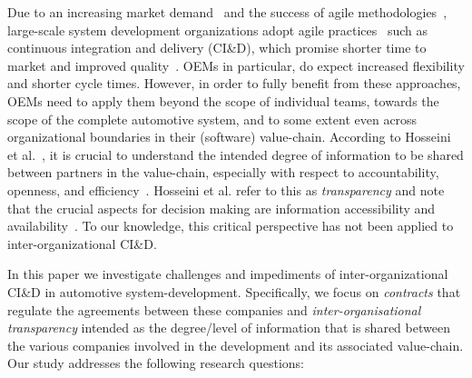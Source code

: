 Due to an increasing market demand~\cite{olsson2012climbing} and the success of agile methodologies~\cite{laanti2011agile}, large-scale system development organizations adopt agile practices~\cite{jalali2010agile} such as continuous integration and delivery (CI\&D), which promise shorter time to market and improved quality~\cite{olsson2012climbing}.
OEMs in particular, do expect increased flexibility and shorter cycle times.
However, in order to fully benefit from these approaches, OEMs need to apply them %
beyond the scope of individual teams, towards the scope of the complete automotive system,  %
and to some extent even across organizational boundaries in their (software) value-chain. %
According to Hosseini et al.~\cite{Hosseini2016}, it is crucial to understand the intended degree of information to be shared between partners in the value-chain, especially with respect to accountability, openness, and efficiency~\cite{Ball2009}.
Hosseini et al. refer to this as \emph{transparency} and note that the crucial aspects for decision making are information accessibility and availability~\cite{Hosseini2016,Turilli2009}.
To our knowledge, this {critical} perspective has not been applied to inter-organizational CI\&D. %

In this paper we investigate %
challenges and impediments of inter-organizational CI\&D in automotive system-development. 
Specifically, we focus on {\em {} contracts} that regulate the agreements between these companies 
and {\em {inter-organisational} transparency} intended as the degree/level of information that is shared between the various companies %
involved in the development and its associated value-chain. %
Our study %
addresses the following research questions:


